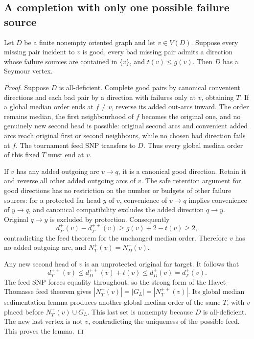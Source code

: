 \subsection{A completion with only one possible failure source}
\label{sec:single-failure-source}

\begin{lemma}
\label{lem:single-failure-source}
Let $D$ be a finite nonempty oriented graph and let $v\in V(D)$.
Suppose every missing pair incident to $v$ is good, every bad missing
pair admits a direction whose failure sources are contained in $\{v\}$,
and $t(v)\le g(v)$. Then $D$ has a Seymour vertex.
\end{lemma}
\begin{proof}
Suppose $D$ is all-deficient. Complete good pairs by canonical
convenient directions and each bad pair by a direction with failures
only at $v$, obtaining $T$. If a global median order ends at $f\ne v$,
reverse its added out-arcs inward. The order remains median, the
first neighbourhood of $f$ becomes the original one, and no genuinely
new second head is possible: original second arcs and convenient
added arcs reach original first or second neighbours, while no chosen
bad direction fails at $f$. The tournament feed SNP transfers to $D$.
Thus every global median order of this fixed $T$ must end at $v$.

If $v$ has any added outgoing arc $v\to q$, it is a canonical good
direction. Retain it and reverse all other added outgoing arcs of $v$.
The safe retention argument for good directions has no restriction
on the number or budgets of other failure sources: for a protected
far head $y$ of $v$, convenience of $v\to q$ implies convenience of
$y\to q$, and canonical compatibility excludes the added direction
$q\to y$. Original $q\to y$ is excluded by protection. Consequently
\[
 d_{T'}^+(v)-d_{T'}^{++}(v)\ge g(v)+2-t(v)\ge2,
\]
contradicting the feed theorem for the unchanged median order.
Therefore $v$ has no added outgoing arc, and $N_T^+(v)=N_D^+(v)$.

Any new second head of $v$ is an unprotected original far target.
It follows that
\[
 d_T^{++}(v)\le d_D^{++}(v)+t(v)\le d_D^+(v)=d_T^+(v).
\]
The feed SNP forces equality throughout, so the strong form of
the Havet--Thomasse feed theorem gives
$|N_T^+(v)|=|G_L|=|N_T^{++}(v)|$.
Its global median sedimentation lemma
\cite[Theorem~1 and Lemma~1]{HavetThomasse2000} produces another
global median order of the same $T$, with $v$ placed before
$N_T^+(v)\cup G_L$. This last set is nonempty because $D$ is
all-deficient. The new last vertex is not $v$, contradicting the
uniqueness of the possible feed. This proves the lemma.
\end{proof}

